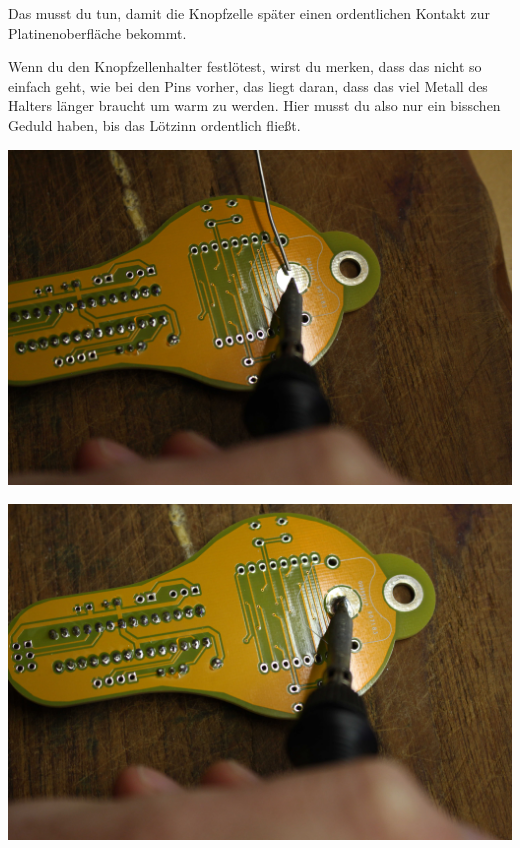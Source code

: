 \documentclass{article}
\begin{document}
Das musst du tun, damit die Knopfzelle später einen ordentlichen Kontakt zur Platinenoberfläche bekommt.

Wenn du den Knopfzellenhalter festlötest, wirst du merken, dass das nicht so einfach geht, wie bei den Pins vorher, das liegt daran, dass das viel Metall des Halters länger braucht um warm zu werden. Hier musst du also nur ein bisschen Geduld haben, bis das Lötzinn ordentlich fließt.

\begin{minipage}[b]{0.5\textwidth}
	\includegraphics[width=\textwidth]{Bilder/IMG_5561.JPG}
	\label{fig:}
\end{minipage}
\begin{minipage}[b]{0.5\textwidth}
	\includegraphics[width=\textwidth]{Bilder/IMG_5562.JPG}
	\label{fig:}
\end{minipage}
\end{document}
